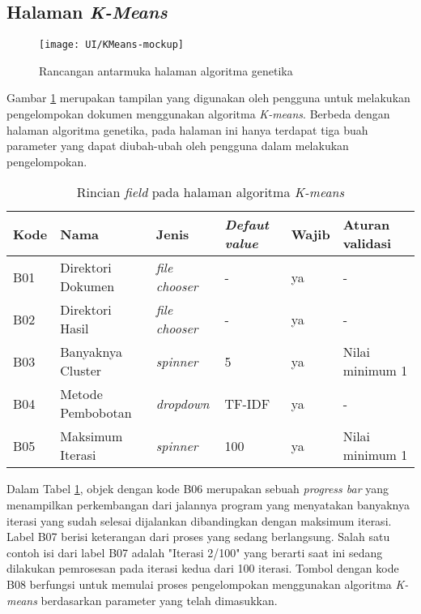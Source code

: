 \subsection{Halaman \textit{K-Means}}
\label{sub:ui-kmeans}
\begin{figure}[H]
	\begin{center}
		\texttt{[image: UI/KMeans-mockup]}
		\caption{Rancangan antarmuka halaman algoritma genetika}
		\label{fig:UI-KMeans}
	\end{center}
\end{figure}

Gambar \ref{fig:UI-KMeans} merupakan tampilan yang digunakan oleh pengguna untuk melakukan pengelompokan dokumen menggunakan algoritma \textit{K-means}. Berbeda dengan halaman algoritma genetika, pada halaman ini hanya terdapat tiga buah parameter yang dapat diubah-ubah oleh pengguna dalam melakukan pengelompokan.

\begin{table}[H]
	\renewcommand{\arraystretch}{2}
	\caption{Rincian \textit{field} pada halaman algoritma \textit{K-means}}
	\begin{tabularx}{\textwidth}{l X l X l X} \hline
		\textbf{Kode} & \textbf{Nama} & \textbf{Jenis} & \textbf{\textit{Defaut value}} & \textbf{Wajib} & \textbf{Aturan validasi} \\ \hline
		B01 & Direktori Dokumen & \textit{file chooser} & - & ya & - \\ \hline
		B02 & Direktori Hasil & \textit{file chooser} & - & ya & - \\ \hline
		B03 & Banyaknya Cluster & \textit{spinner} & 5 & ya & Nilai minimum 1 \\ \hline
		B04 & Metode Pembobotan & \textit{dropdown} & TF-IDF & ya & - \\ \hline
		B05 & Maksimum Iterasi & \textit{spinner} & 100 & ya & Nilai minimum 1\\ \hline
	\end{tabularx}
	\label{tbl:field-KMeans}
\end{table}

Dalam Tabel \ref{tbl:field-KMeans}, objek dengan kode B06 merupakan sebuah \textit{progress bar} yang menampilkan perkembangan dari jalannya program yang menyatakan banyaknya iterasi yang sudah selesai dijalankan dibandingkan dengan maksimum iterasi. Label B07 berisi keterangan dari proses yang sedang berlangsung. Salah satu contoh isi dari label B07 adalah "Iterasi 2/100" yang berarti saat ini sedang dilakukan pemrosesan pada iterasi kedua dari 100 iterasi. Tombol dengan kode B08 berfungsi untuk memulai proses pengelompokan menggunakan algoritma \textit{K-means} berdasarkan parameter yang telah dimasukkan.
